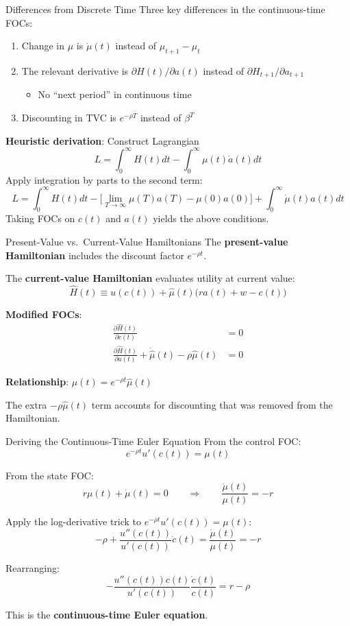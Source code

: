 \documentclass[blue]{beamer}
\begin{document}
\begin{frame}{Differences from Discrete Time}
	Three key differences in the continuous-time FOCs:
	
	\begin{enumerate}
		\item Change in $\mu$ is $\dot{\mu}(t)$ instead of $\mu_{t+1} - \mu_t$
		\item The relevant derivative is $\partial H(t)/\partial a(t)$ instead of $\partial H_{t+1}/\partial a_{t+1}$
		\begin{itemize}
			\item No ``next period'' in continuous time
		\end{itemize}
		\item Discounting in TVC is $e^{-\rho T}$ instead of $\beta^T$
	\end{enumerate}
	
	\bigskip
	\textbf{Heuristic derivation}: Construct Lagrangian
	\[
	{L} = \int_0^\infty H(t) dt - \int_0^\infty \mu(t)\dot{a}(t)dt
	\]
	Apply integration by parts to the second term:
	\[
	{L} = \int_0^\infty H(t) dt - \bigl[\lim_{T\to\infty}\mu(T)a(T) - \mu(0)a(0)\bigr] + \int_0^\infty \dot{\mu}(t)a(t) dt
	\]
	Taking FOCs on $c(t)$ and $a(t)$ yields the above conditions.
\end{frame}


\begin{frame}{Present-Value vs.\ Current-Value Hamiltonians}
	The \textbf{present-value Hamiltonian} includes the discount factor $e^{-\rho t}$.
	
	\bigskip
	The \textbf{current-value Hamiltonian} evaluates utility at current value:
	\[
	\hat{H}(t) \equiv u(c(t)) + \hat{\mu}(t)\bigl(ra(t) + w - c(t)\bigr)
	\]
	
	\textbf{Modified FOCs}:
	\begin{align*}
		\frac{\partial\hat{H}(t)}{\partial c(t)} &= 0 \\[4pt]
		\frac{\partial\hat{H}(t)}{\partial a(t)} + \dot{\hat{\mu}}(t) - \rho \hat{\mu}(t) &= 0
	\end{align*}
	
	\textbf{Relationship}: $\mu(t) = e^{-\rho t} \hat{\mu}(t)$
	
	\medskip
	The extra $-\rho\hat{\mu}(t)$ term accounts for discounting that was removed from the Hamiltonian.
\end{frame}

\begin{frame}{Deriving the Continuous-Time Euler Equation}
	From the control FOC:
	\[
	e^{-\rho t} u'(c(t)) = \mu(t)
	\]
	
	From the state FOC:
	\[
	r \mu(t) + \dot{\mu}(t) = 0 \qquad \Rightarrow \qquad \frac{\dot{\mu}(t)}{\mu(t)} = -r
	\]
	
	Apply the log-derivative trick to $e^{-\rho t} u'(c(t)) = \mu(t)$:
	\[
	-\rho + \frac{u''(c(t))}{u'(c(t))} \dot{c}(t) = \frac{\dot{\mu}(t)}{\mu(t)} = -r
	\]
	
	Rearranging:
	\[
	{-\frac{u''(c(t)) c(t)}{u'(c(t))} \frac{\dot{c}(t)}{c(t)} = r - \rho}
	\]
	
	This is the \textbf{continuous-time Euler equation}.
\end{frame}
\end{document}
